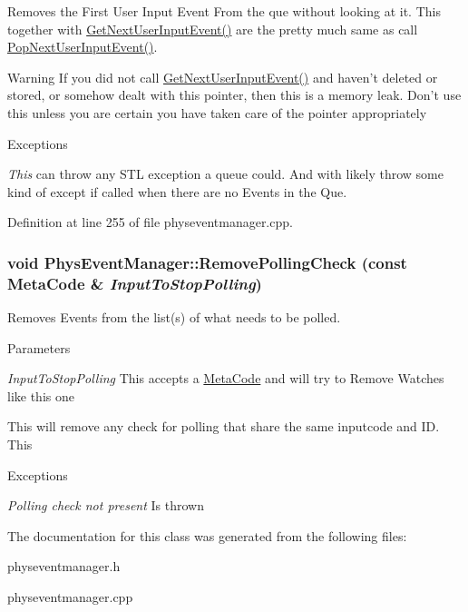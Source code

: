 Removes the First User Input Event From the que without looking at it. This together with \hyperlink{classPhysEventManager_a4874a9b1138d2351bf28e527a66c02b8}{GetNextUserInputEvent()} are the pretty much same as call \hyperlink{classPhysEventManager_ad6612a6e1c728941e2c467e7f136ca51}{PopNextUserInputEvent()}. \begin{DoxyWarning}{Warning}
If you did not call \hyperlink{classPhysEventManager_a4874a9b1138d2351bf28e527a66c02b8}{GetNextUserInputEvent()} and haven't deleted or stored, or somehow dealt with this pointer, then this is a memory leak. Don't use this unless you are certain you have taken care of the pointer appropriately 
\end{DoxyWarning}

\begin{DoxyExceptions}{Exceptions}
\item[{\em This}]can throw any STL exception a queue could. And with likely throw some kind of except if called when there are no Events in the Que. \end{DoxyExceptions}


Definition at line 255 of file physeventmanager.cpp.\hypertarget{classPhysEventManager_af81bf9a5f081f44a6cd91fdd19d4a42a}{
\subsubsection[{RemovePollingCheck}]{\setlength{\rightskip}{0pt plus 5cm}void PhysEventManager::RemovePollingCheck (const {\bf MetaCode} \& {\em InputToStopPolling})}}
\label{d5/dd7/classPhysEventManager_af81bf9a5f081f44a6cd91fdd19d4a42a}


Removes Events from the list(s) of what needs to be polled. 
\begin{DoxyParams}{Parameters}
\item[{\em InputToStopPolling}]This accepts a \hyperlink{classMetaCode}{MetaCode} and will try to Remove Watches like this one\end{DoxyParams}
This will remove any check for polling that share the same inputcode and ID. This 
\begin{DoxyExceptions}{Exceptions}
\item[{\em Polling check not present}]Is thrown \end{DoxyExceptions}


The documentation for this class was generated from the following files:\begin{DoxyCompactItemize}
\item 
physeventmanager.h\item 
physeventmanager.cpp\end{DoxyCompactItemize}
